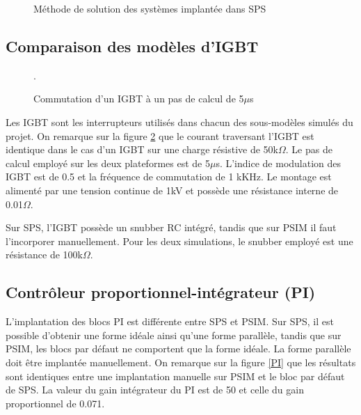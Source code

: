 \begin{figure}
\caption{Méthode de solution des systèmes implantée dans SPS}
\label{fig_solving_SPS}
\end{figure}

\subsection{Comparaison des modèles d'IGBT}

\begin{figure}[htb]
\caption{Commutation d'un IGBT à un pas de calcul de 5$\mu$s}.
\label{IG}
\end{figure}

Les IGBT sont les interrupteurs utilisés dans chacun des sous-modèles simulés du projet. On remarque sur la figure \ref{IG} que le  courant traversant l'IGBT est identique dans le cas d'un IGBT sur une charge résistive de 50k$\Omega$. Le pas de calcul employé sur les deux plateformes est de 5$\mu$s. L'indice de modulation des IGBT est de 0.5 et la fréquence de commutation de 1 kKHz. Le montage est alimenté par une tension continue de 1kV et possède une résistance interne de 0.01$\Omega$. 

Sur SPS, l'IGBT possède un snubber RC intégré, tandis que sur PSIM il faut l'incorporer manuellement. Pour les deux simulations, le snubber employé est une résistance de 100k$\Omega$.
 
\subsection{Contrôleur proportionnel-intégrateur (PI)}
L'implantation des blocs PI est différente entre SPS et PSIM. Sur SPS, il est possible d'obtenir une forme idéale ainsi qu'une forme parallèle, tandis que sur PSIM, les blocs par défaut ne comportent que la forme idéale. La forme parallèle doit être implantée manuellement. On remarque sur la figure \ref{PI} que les résultats sont identiques entre une implantation manuelle sur PSIM et le bloc par défaut de SPS. La valeur du gain intégrateur du PI est de 50 et celle du gain proportionnel de 0.071. 

